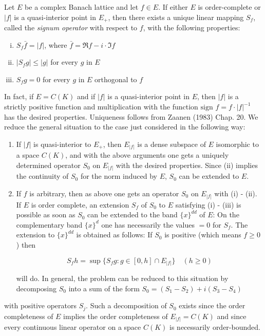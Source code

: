Let $ E $ be a complex Banach lattice and let $ f \in E $.
If either $ E $ is order-complete or $ |f| $ is a quasi-interior point in $ E_{+} $, then there exists a unique linear mapping $ S_{f} $, called the \emph{signum operator} with respect to $ f $, with the following properties:

\begin{enumerate}[(i)]
\item $ S_{f}\bar{f} = |f| $, where $ \bar{f} = \Re f - i\cdot\Im f $

\item $ |S_{f}g| \leq |g| $ for every $ g $ in $ E $

\item $ S_{f}g = 0 $ for every $ g $ in $ E $ orthogonal to $ f $
\end{enumerate}

In fact, if $ E = C(K) $ and if $ |f| $ is a quasi-interior point in $ E $, then $ |f| $ is a strictly positive function and multiplication with the function $ \text{sign } f = f\cdot|f|^{-1} $ has the desired properties.
Uniqueness follows from Zaanen (1983) Chap. 20.
We reduce the general situation to the case just considered in the following way:

\begin{enumerate}[1.]
\item If $ |f| $ is quasi-interior to $ E_{+} $, then $ E_{|f|} $ is a dense subspace of $ E $ isomorphic to a space $ C(K) $, and with the above arguments one gets a uniquely determined operator $ S_{0} $ on $ E_{|f|} $ with the desired properties.
Since (ii) implies the continuity of $ S_{0} $ for the norm induced by $ E $, $ S_{0} $ can be extended to $ E $.

\item If $ f $ is arbitrary, then as above one gets an operator $ S_{0} $ on $ E_{|f|} $ with (i) - (ii).
If $ E $ is order complete, an extension $ S_{f} $ of $ S_{0} $ to $ E $ satisfying (i) - (iii) is possible as soon as $ S_{0} $ can be extended to the band $ \{x\}^{dd} $ of $ E $:
On the complementary band $ \{x\}^{d} $ one has necessarily the values $ = 0 $ for $ S_{f} $.
The extension to $ \{x\}^{dd} $ is obtained as follows:
If $ S_{0} $ is positive (which means $ f \geq 0 $) then

\[
S_{f}h = \sup \{ S_{f}g : g \in [0,h] \cap E_{|f|} \} \quad (h \geq 0)
\]

will do.
In general, the problem can be reduced to this situation by decomposing $ S_{0} $ into a sum of the form $ S_{0} = (S_{1} - S_{2}) + i(S_{3} - S_{4}) $

\end{enumerate}
\pagebreak
with positive operators $ S_{j} $.
Such a decomposition of $ S_{0} $ exists since the order completeness of $ E $ implies the order completeness of $ E_{|f|} = C(K) $ and since every continuous linear operator on a space $ C(K) $ is necessarily order-bounded.

